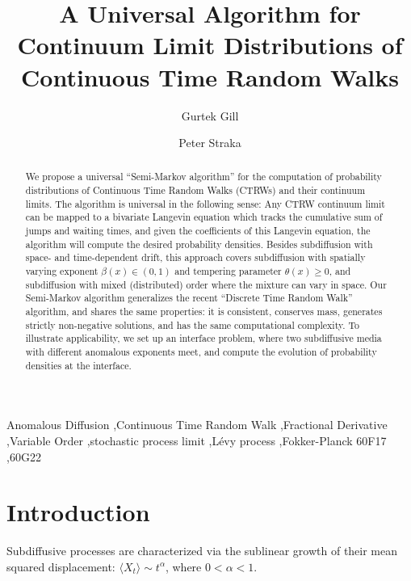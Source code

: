 \documentclass[a4paper,12pt]{elsarticle}
\numberwithin{equation}{section}
\theoremstyle{plain}
\theoremstyle{definition}
\theoremstyle{remark}
\numberwithin{equation}{section}
\newcommand{\1}{\mathbf 1}
\begin{document}
\begin{frontmatter}

\title{A Universal Algorithm for Continuum Limit Distributions of
Continuous Time Random Walks}
\author[UNSW]{Gurtek Gill}
\author[UNSW]{Peter Straka}
\address[UNSW]{School of Mathematics \& Statistics, UNSW Sydney}

\begin{abstract}
We propose a universal ``Semi-Markov algorithm'' for the computation of
probability distributions of Continuous Time Random Walks (CTRWs) and their
continuum limits.
The algorithm is universal in the following sense: Any CTRW continuum limit
can be mapped to a bivariate Langevin equation which tracks the cumulative sum
of jumps and waiting times, and given the coefficients of this Langevin
equation, the algorithm will compute the desired probability densities.
Besides subdiffusion with space- and time-dependent drift, this approach
covers subdiffusion with spatially varying exponent $\beta(x) \in (0,1)$ and
tempering parameter $\theta(x) \ge 0$, and subdiffusion with mixed (distributed)
order where the mixture can vary in space.
Our Semi-Markov algorithm generalizes the recent
``Discrete Time Random Walk'' algorithm, and shares the same properties:
it is consistent, conserves mass, generates strictly non-negative solutions,
and has the same computational complexity.
To illustrate applicability, we set up an interface problem, where two
subdiffusive media with different anomalous exponents meet, and compute the
evolution of probability densities at the interface.
\end{abstract}

\begin{keyword}
Anomalous Diffusion \sep Continuous Time Random Walk \sep Fractional Derivative \sep Variable Order \sep stochastic process limit \sep L\'evy process \sep Fokker-Planck
\MSC[2010] 60F17 \sep  60G22
\end{keyword}

\end{frontmatter}

\section{Introduction}

Subdiffusive processes are characterized via the sublinear growth of their
mean squared displacement: $\langle X_t \rangle \sim t^\alpha$, where
$0 < \alpha < 1$. 
\end{document}
